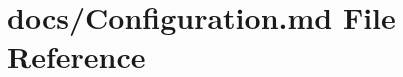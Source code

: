 \hypertarget{Configuration_8md}{\section{docs/\+Configuration.md File Reference}
\label{Configuration_8md}
}

